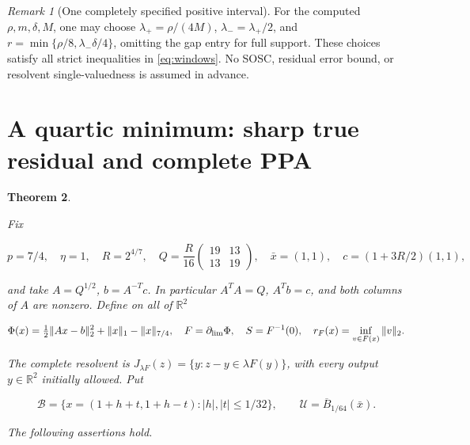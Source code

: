 \documentclass[11pt]{article}
\newtheorem{theorem}{Theorem}[section]
\theoremstyle{remark}\newtheorem{remark}[theorem]{Remark}
\begin{document}
\begin{remark}[One completely specified positive interval]
For the computed $\rho,m,\delta,M$, one may choose
$\lambda_+=\rho/(4M)$, $\lambda_-=\lambda_+/2$, and
$r=\min\{\rho/8,\lambda_-\delta/4\}$, omitting the gap entry for full
support. These choices satisfy all strict inequalities in
\eqref{eq:windows}. No SOSC, residual error bound, or resolvent
single-valuedness is assumed in advance.
\end{remark}


\clearpage
\section{A quartic minimum: sharp true residual and complete PPA}
\begin{theorem}\label{thm:slow}

Fix

\[
p=7/4,\quad \eta=1,\quad R=2^{4/7},\quad
Q=\frac R{16}\begin{pmatrix}19&13\\13&19\end{pmatrix},\quad
\bar x=(1,1),\quad c=(1+3R/2)(1,1),
\]

and take \(A=Q^{1/2}\), \(b=A^{-T}c\). In particular \(A^TA=Q\), \(A^Tb=c\), and both columns of \(A\) are nonzero. Define on all of \(\mathbb R^2\)

\[
\Phi(x)=\tfrac12\|Ax-b\|_2^2+\|x\|_1-\|x\|_{7/4},\quad
F=\partial_{\rm lim}\Phi,\quad S=F^{-1}(0),\quad
r_F(x)=\inf_{v\in F(x)}\|v\|_2.
\]

The complete resolvent is \(J_{\lambda F}(z)=\{y:z-y\in\lambda F(y)\}\), with every output \(y\in\mathbb R^2\) initially allowed. Put

\[
\mathcal B=\{x=(1+h+t,1+h-t): |h|,|t|\le 1/32\},\qquad
\mathcal U=\overline B_{1/64}(\bar x).
\]

The following assertions hold.


\end{theorem}
\end{document}
